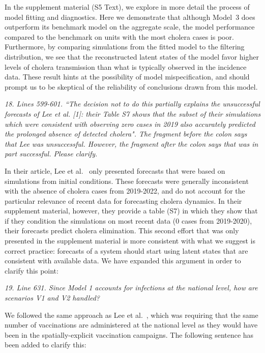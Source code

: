 \documentclass[11pt]{article}
\newcommand\report[1]{{\color{mygreen} \vspace{1mm}\hspace{0.25in}\parbox{6in}{\em #1}}}
\newcommand\article[1]{{\color{blue} \vspace{1mm}\hspace{0.25in}\parbox{6in}{\em #1}}}
\begin{document}
In the supplement material (S5 Text), we explore in more detail the process of model fitting and diagnostics. Here we demonstrate that although Model~3 does outperform its benchmark model on the aggregate scale, the model performance compared to the benchmark on units with the most cholera cases is poor. Furthermore, by comparing simulations from the fitted model to the filtering distribution, we see that the reconstructed latent states of the model favor higher levels of cholera transmission than what is typically observed in the incidence data. 
These result hints at the possibility of model mispecification, and should prompt us to be skeptical of the reliability of conclusions drawn from this model.

\report{
  18. Lines 599-601. ``The decision not to do this partially explains the unsuccessful forecasts of Lee et al. [1]: their Table S7 shows that the subset of their simulations which were consistent with observing zero cases in 2019 also accurately predicted the prolonged absence of detected cholera". The fragment before the colon says that Lee was unsuccessful. However, the fragment after the colon says that was in part successful. Please clarify.
}

In their article, Lee et al.~\cite{lee20} only presented forecasts that were based on simulations from initial conditions. These forecasts were generally inconsistent with the absence of cholera cases from 2019-2022, and do not account for the particular relevance of recent data for forecasting cholera dynamics. In their supplement material, however, they provide a table (S7) in which they show that if they condition the simulations on most recent data (0 cases from 2019-2020), their forecasts predict cholera elimination. This second effort that was only presented in the supplement material is more consistent with what we suggest is correct practice: forecasts of a system should start using latent states that are consistent with available data. We have expanded this argument in order to clarify this point:

\article{\editForecastOne}

\article{\editForecastTwo}

\report{
  19. Line 631. Since Model 1 accounts for infections at the national level, how are scenarios V1 and V2 handled?
}

We followed the same approach as Lee et al.~\cite{lee20}, which was requiring that the same number of vaccinations are administered at the national level as they would have been in the spatially-explicit vaccination campaigns.
The following sentence has been added to clarify this:

\article{\editModVacc}


\end{document}
